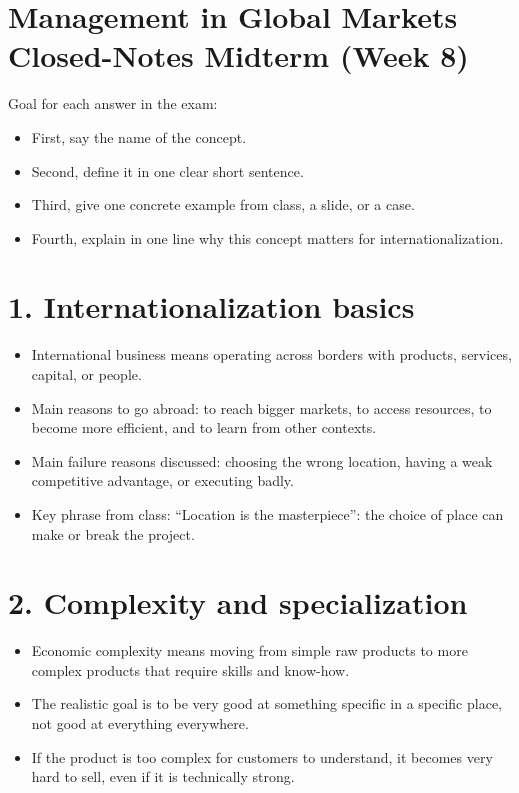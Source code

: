 \documentclass[10pt,a4paper]{article}
\begin{document}
\section*{Management in Global Markets Closed-Notes Midterm (Week 8)}

Goal for each answer in the exam:
\begin{itemize}
\item First, say the name of the concept.
\item Second, define it in one clear short sentence.
\item Third, give one concrete example from class, a slide, or a case.
\item Fourth, explain in one line why this concept matters for internationalization.
\end{itemize}

\section*{1. Internationalization basics}
\begin{itemize}
\item International business means operating across borders with products, services, capital, or people.
\item Main reasons to go abroad: to reach bigger markets, to access resources, to become more efficient, and to learn from other contexts.
\item Main failure reasons discussed: choosing the wrong location, having a weak competitive advantage, or executing badly.
\item Key phrase from class: “Location is the masterpiece”: the choice of place can make or break the project.
\end{itemize}

\section*{2. Complexity and specialization}
\begin{itemize}
\item Economic complexity means moving from simple raw products to more complex products that require skills and know-how.
\item The realistic goal is to be very good at something specific in a specific place, not good at everything everywhere.
\item If the product is too complex for customers to understand, it becomes very hard to sell, even if it is technically strong.
\end{itemize}
\end{document}
